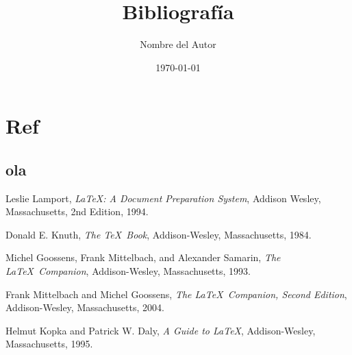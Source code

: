 \chapter{Ref}\label{app:Ref}


	
	\title{Bibliografía}
	\author{Nombre del Autor}
	\date{\today}
	\maketitle
	
	\section*{ola}
	
	\begin{thebibliography}{9}
		
		Leslie Lamport,
		\textit{\LaTeX: A Document Preparation System},
		Addison Wesley, Massachusetts,
		2nd Edition,
		1994.
		
		Donald E. Knuth,
		\textit{The \TeX\ Book},
		Addison-Wesley, Massachusetts,
		1984.
		
		Michel Goossens, Frank Mittelbach, and Alexander Samarin,
		\textit{The \LaTeX\ Companion},
		Addison-Wesley, Massachusetts,
		1993.
		
		Frank Mittelbach and Michel Goossens,
		\textit{The \LaTeX\ Companion, Second Edition},
		Addison-Wesley, Massachusetts,
		2004.
		
		Helmut Kopka and Patrick W. Daly,
		\textit{A Guide to \LaTeX},
		Addison-Wesley, Massachusetts,
		1995.
		
	\end{thebibliography}
	

